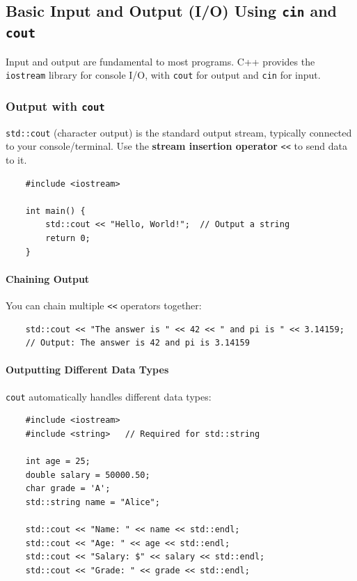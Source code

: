 \subsection{Basic Input and Output (I/O) Using \texttt{cin} and \texttt{cout}}

Input and output are fundamental to most programs. C++ provides the \texttt{iostream} library for console I/O, with \texttt{cout} for output and \texttt{cin} for input.

\subsubsection{Output with \texttt{cout}}

\texttt{std::cout} (character output) is the standard output stream, typically connected to your console/terminal. Use the \textbf{stream insertion operator} \texttt{<<} to send data to it.

\begin{lstlisting}
	#include <iostream>
	
	int main() {
		std::cout << "Hello, World!";  // Output a string
		return 0;
	}
\end{lstlisting}

\paragraph{Chaining Output}

You can chain multiple \texttt{<<} operators together:

\begin{lstlisting}
	std::cout << "The answer is " << 42 << " and pi is " << 3.14159;
	// Output: The answer is 42 and pi is 3.14159
\end{lstlisting}

\paragraph{Outputting Different Data Types}

\texttt{cout} automatically handles different data types:

\begin{lstlisting}
	#include <iostream>
	#include <string>   // Required for std::string

	int age = 25;
	double salary = 50000.50;
	char grade = 'A';
	std::string name = "Alice";

	std::cout << "Name: " << name << std::endl;
	std::cout << "Age: " << age << std::endl;
	std::cout << "Salary: $" << salary << std::endl;
	std::cout << "Grade: " << grade << std::endl;
\end{lstlisting}

